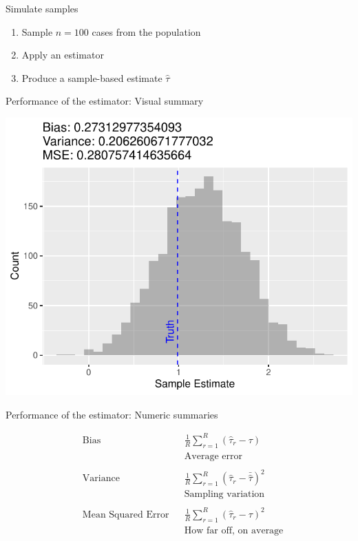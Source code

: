 \documentclass{beamer}
\begin{document}
\begin{frame}{Simulate samples}

\begin{enumerate}
\item Sample $n = 100$ cases from the population \pause
\item Apply an estimator \pause
\item Produce a sample-based estimate $\hat\tau$
\end{enumerate}

\end{frame}

\begin{frame}{Performance of the estimator: Visual summary}

\includegraphics[width = .8\textwidth]{figures/simulation_histogram}

\end{frame}

\begin{frame}{Performance of the estimator: Numeric summaries}

$$\begin{aligned}
&\text{Bias} && \frac{1}{R}\sum_{r=1}^R \left(\hat\tau_r - \tau\right) \\
&&&\text{Average error}\\ \\
&\text{Variance} && \frac{1}{R}\sum_{r=1}^R \left(\hat\tau_r - \bar{\hat\tau}\right)^2 \\
&&&\text{Sampling variation}\\ \\
&\text{Mean Squared Error} && \frac{1}{R}\sum_{r=1}^R \left(\hat\tau_r - \tau\right)^2 \\
&&&\text{How far off, on average}
\end{aligned}$$

\end{frame}
\end{document}
